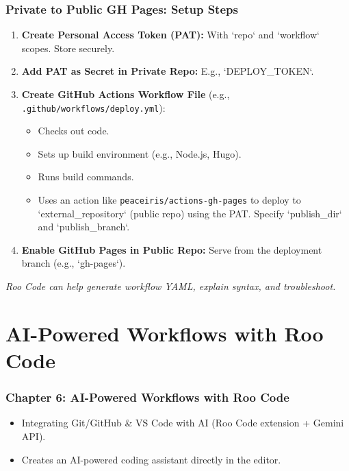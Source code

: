 \documentclass{beamer}
\begin{document}
\begin{frame}
  \frametitle{Private to Public GH Pages: Setup Steps}
  \begin{enumerate}
    \item \textbf{Create Personal Access Token (PAT):} With `repo` and `workflow` scopes. Store securely.
    \item \textbf{Add PAT as Secret in Private Repo:} E.g., `DEPLOY_TOKEN`.
    \item \textbf{Create GitHub Actions Workflow File} (e.g., \texttt{.github/workflows/deploy.yml}):
    \begin{itemize}
        \item Checks out code.
        \item Sets up build environment (e.g., Node.js, Hugo).
        \item Runs build commands.
        \item Uses an action like \texttt{peaceiris/actions-gh-pages} to deploy to `external_repository` (public repo) using the PAT. Specify `publish_dir` and `publish_branch`.
    \end{itemize}
    \item \textbf{Enable GitHub Pages in Public Repo:} Serve from the deployment branch (e.g., `gh-pages`).
  \end{enumerate}
  \textit{Roo Code can help generate workflow YAML, explain syntax, and troubleshoot.}
\end{frame}

\section{AI-Powered Workflows with Roo Code}
\begin{frame}
  \frametitle{Chapter 6: AI-Powered Workflows with Roo Code}
  \begin{itemize}
    \item Integrating Git/GitHub \& VS Code with AI (Roo Code extension + Gemini API).
    \item Creates an AI-powered coding assistant directly in the editor.
  \end{itemize}
\end{frame}
\end{document}
